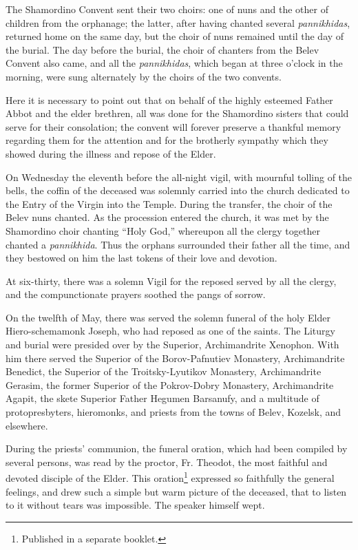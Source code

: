 The Shamordino Convent sent their two choirs: one of nuns and the other of children from the orphanage; the latter, after having chanted several \textit{pannikhidas}, returned home on the same day, but the choir of nuns remained until the day of the burial. The day before the burial, the choir of chanters from the Belev Convent also came, and all the \textit{pannikhidas}, which began at three o'clock in the morning, were sung alternately by the choirs of the two convents.

Here it is necessary to point out that on behalf of the highly esteemed Father Abbot and the elder brethren, all was done for the Shamordino sisters that could serve for their consolation; the convent will forever preserve a thankful memory regarding them for the attention and for the brotherly sympathy which they showed during the illness and repose of the Elder.

On Wednesday the eleventh before the all-night vigil, with mournful tolling of the bells, the coffin of the deceased was solemnly carried into the church dedicated to the Entry of the Virgin into the Temple. During the transfer, the choir of the Belev nuns chanted. As the procession entered the church, it was met by the Shamordino choir chanting “Holy God,” whereupon all the clergy together chanted a \textit{pannikhida}. Thus the orphans surrounded their father all the time, and they bestowed on him the last tokens of their love and devotion.

At six-thirty, there was a solemn Vigil for the reposed served by all the clergy, and the compunctionate prayers soothed the pangs of sorrow.

On the twelfth of May, there was served the solemn funeral of the holy Elder Hiero-schemamonk Joseph, who had reposed as one of the saints. The Liturgy and burial were presided over by the Superior, Archimandrite Xenophon. With him there served the Superior of the Borov-Pafnutiev Monastery, Archimandrite Benedict, the Superior of the Troitsky-Lyutikov Monastery, Archimandrite Gerasim, the former Superior of the Pokrov-Dobry Monastery, Archimandrite Agapit, the skete Superior Father Hegumen Barsanufy, and a multitude of protopresbyters, hieromonks, and priests from the towns of Belev, Kozelsk, and elsewhere.

During the priests' communion, the funeral oration, which had been compiled by several persons, was read by the proctor, Fr. Theodot, the most faithful and devoted disciple of the Elder. This oration\footnote{Published in a separate booklet.} expressed so faithfully the general feelings, and drew such a simple but warm picture of the deceased, that to listen to it without tears was impossible. The speaker himself wept.

